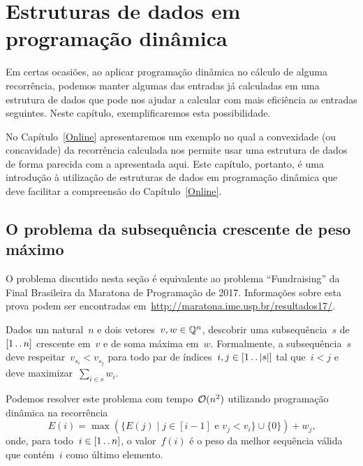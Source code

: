 \chapter{Estruturas de dados em programação dinâmica}
\label{EDPD}

Em certas ocasiões, ao aplicar programação dinâmica no cálculo de alguma recorrência, podemos manter algumas das entradas já calculadas em uma estrutura de dados que pode nos ajudar a calcular com mais eficiência as entradas seguintes. Neste capítulo, exemplificaremos esta possibilidade. 

No Capítulo~\ref{Online} apresentaremos um exemplo no qual a convexidade (ou concavidade) da recorrência calculada nos permite usar uma estrutura de dados de forma parecida com a apresentada aqui. Este capítulo, portanto, é uma introdução à utilização de estruturas de dados em programação dinâmica que deve facilitar a compreensão do Capítulo~\ref{Online}.


\section{O problema da subsequência crescente de peso máximo}

O problema discutido nesta seção é equivalente ao problema ``Fundraising'' da Final Brasileira da Maratona de Programação de 2017. Informações sobre esta prova podem ser encontradas em~\href{http://maratona.ime.usp.br/resultados17/}{http://maratona.ime.usp.br/resultados17/}.

\begin{prob} \label{EDPD:HIS}
Dados um natural~$n$ e dois vetores~${ v,w \in \mathbb{Q}^n }$, descobrir uma subsequência~$s$ de~$[1 \,.\,.\, n]$ crescente em~$v$ e de soma máxima em~$w$. Formalmente, a subsequência~$s$ deve respeitar~${ v_{s_i} < v_{s_j} }$ para todo par de índices~${ i,j \in [1 \,.\,.\, |s|] }$ tal que~${ i < j }$ e deve maximizar~${ \sum\limits_{i \in s} w_i }$.
\end{prob}

Podemos resolver este problema com tempo~$\mathcal{O}(n^2)$ utilizando programação dinâmica na recorrência
\begin{equation} \label{EDPD:HIS:rec}
E(i) = \max(\{E(j) \mid j \in [i-1] \text{ e } v_j < v_i\} \cup \{0\}) + w_j \text{,}
\end{equation}
onde, para todo~$i \in [1 \,.\,.\, n]$, o valor~$f(i)$ é o peso da melhor sequência válida que contém~$i$ como último elemento.


